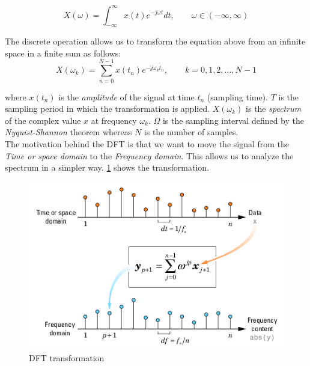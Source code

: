 \begin{equation}
X(\omega) = \int_{-\infty}^\infty x(t)e^{-j\omega t} dt, \qquad \omega\in(-\infty,\infty)
\end{equation}

\noindent The discrete operation allows us to transform the equation above from an infinite space in a finite sum as follows:
\begin{equation}
X(\omega_k ) = \sum_{n=0}^{N-1}x(t_n)e^{-j\omega_k t_n}, \qquad k=0,1,2,\ldots,N-1
\end{equation}

where $x(t_n)$ is the \textit{amplitude} of the signal at time $t_n$ (sampling time). $T$ is the sampling period in which the transformation is applied. $X(\omega_k )$ is the \textit{spectrum} of the complex value $x$ at frequency $\omega_k$. $\Omega$ is the sampling interval defined by the \textit{Nyquist-Shannon} theorem whereas $N$ is the number of samples. \\

\noindent The motivation behind the DFT is that we want to move the signal from the \textit{Time or space domain} to the \textit{Frequency domain}. This allows us to analyze the spectrum in a simpler way. \ref{fig:dft} shows the transformation.

\begin{figure}[!ht]
	\centering
	\includegraphics[scale=0.7]{Figures/dft.png}
	\caption{DFT transformation \cite{dft_matlab}}
	\label{fig:dft}
\end{figure}





















